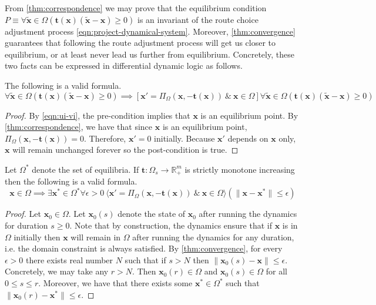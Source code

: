 From \cref{thm:correspondence} we may prove that the equilibrium condition $P \equiv \forall \mathbf{\tilde{x}} \in \Omega (\mathbf{t}(\mathbf{x})(\mathbf{\tilde{x}}- \mathbf{x}) \geq 0)$ is an invariant of the route choice adjustment process \eqref{eqn:project-dynamical-system}.
Moreover, \cref{thm:convergence} guarantees that following the route adjustment process will get us closer to equilibrium, or at least never lead us further from equilibrium.
Concretely, these two facts can be expressed in differential dynamic logic as follows.

\begin{theorem}
    The following is a valid formula.
    $$\forall \mathbf{\tilde{x}} \in \Omega (\mathbf{t}(\mathbf{x})(\mathbf{\tilde{x}}- \mathbf{x}) \geq 0) \implies [\mathbf{x}'=\Pi_{\Omega}(\mathbf{x}, -\mathbf{t}(\mathbf{x}))\ \&\ \mathbf{x}\in \Omega] \forall \mathbf{\tilde{x}} \in \Omega (\mathbf{t}(\mathbf{x})(\mathbf{\tilde{x}}- \mathbf{x}) \geq 0)$$
\end{theorem}

\begin{proof}
    By \eqref{eqn:ui-vi}, the pre-condition implies that $\mathbf{x}$ is an equilibrium point.
    By \cref{thm:correspondence}, we have that since $\mathbf{x}$ is an equilibrium point,  $\Pi_{\Omega}(\mathbf{x}, -\mathbf{t}(\mathbf{x})) = 0$.
    Therefore, $\mathbf{x}'=0$ initially. Because $\mathbf{x}'$ depends on $\mathbf{x}$ only, $\mathbf{x}$ will remain unchanged forever so the post-condition is true.
\end{proof}

\begin{theorem}
    \label{thm:dl:convergence}
    Let $\Omega^*$ denote the set of equilibria.
    If $\mathbf{t}: \Omega_s \to \mathbb{R}^m_+$ is strictly monotone increasing then the following is a valid formula.
    $$\mathbf{x} \in \Omega \implies \exists \mathbf{x}^*\in \Omega^* \forall \epsilon > 0\ \langle \mathbf{x}'=\Pi_{\Omega}(\mathbf{x}, -\mathbf{t}(\mathbf{x}))\ \&\ \mathbf{x}\in \Omega\rangle ( \|\mathbf{x} - \mathbf{x}^*\| \leq \epsilon)$$
\end{theorem}

\begin{proof}
    Let $\mathbf{x}_0 \in \Omega$. Let $\mathbf{x}_0(s)$ denote the state of $\mathbf{x}_0$ after running the dynamics for duration $s\geq 0$.
    Note that by construction, the dynamics ensure that if $\mathbf{x}$ is in $\Omega$ initially then $\mathbf{x}$ will remain in $\Omega$ after running the dynamics for any duration, i.e. the domain constraint is always satisfied.
    By \cref{thm:convergence}, for every $\epsilon > 0$ there exists real number $N$ such that if $s > N$ then $\|\mathbf{x}_0(s) - \mathbf{x}\| \leq \epsilon$. 
    Concretely, we may take any $r > N$.
    Then $\mathbf{x}_0(r) \in \Omega$ and $\mathbf{x}_0(s) \in \Omega$ for all $0 \leq s \leq r$.
    Moreover, we have that there exists some $\mathbf{x}^*\in \Omega^*$  such that $\|\mathbf{x}_0(r) - \mathbf{x}^*\| \leq \epsilon$.
\end{proof}
